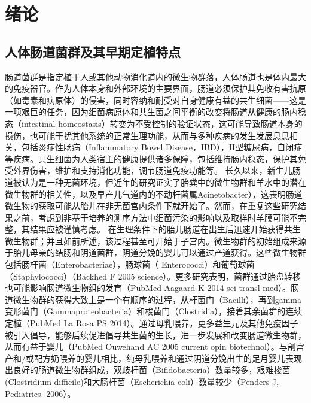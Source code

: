 
\chapter{绪论}
\label{chap:introduction}
\section{人体肠道菌群及其早期定植特点}
肠道菌群是指定植于人或其他动物消化道内的微生物群落，人体肠道也是体内最大的免疫器官。作为人体本身和外部环境的主要界面，肠道必须保护其免收有害抗原（如毒素和病原体）的侵害，同时容纳和耐受对自身健康有益的共生细菌——这是一项艰巨的任务，因为细菌病原体和共生菌之间平衡的改变将肠道从健康的肠内稳态（intestinal homeostasis）\cite{collier2005innate}转变为不受控制的验证状态，这可能导致肠道本身的损伤，也可能干扰其他系统的正常生理功能，从而与多种疾病的发生发展息息相关，包括炎症性肠病（Inflammatory Bowel Disease，IBD）\cite{ni2017gut}，II型糖尿病\cite{harsch2018role}，自闭症\cite{de2014altered, de2013fecal}等疾病。共生细菌为人类宿主的健康提供诸多保障，包括维持肠内稳态\cite{hooper2001commensal}，保护其免受外界伤害\cite{rakoff2004recognition}，维护和支持消化功能\cite{guarner2006mechanisms}，调节肠道免疫功能\cite{round2009gut,abreu2010toll}等。
长久以来，新生儿肠道被认为是一种无菌环境，但近年的研究证实了胎粪中的微生物群和羊水中的潜在微生物群的相关性\cite{ardissone2014meconium}，以及早产儿气道内的不动杆菌属Acinetobacter）\cite{lohmann2014airway}，这表明肠道微生物的获取可能从胎儿在非无菌宫内条件下就开始了。然而，在重复这些研究结果之前，考虑到非基于培养的测序方法\cite{pennisi2014our}中细菌污染的影响以及取样时羊膜可能不完整，其结果应被谨慎考虑。
在生理条件下的胎儿肠道在出生后迅速开始获得共生微生物群；并且如前所述，该过程甚至可开始于子宫内。微生物群的初始组成来源于胎儿母亲的结肠和阴道菌群，阴道分娩的婴儿可以通过产道获得。这些微生物群包括肠杆菌（Enterobacteriae），肠球菌（ Enterococci）和葡萄球菌（Staphylococci）\cite{}（Backhed F 2005 science）。更多研究表明，菌群通过胎盘转移也可能影响肠道微生物组的发育\cite{}（PubMed Aagaard K 2014 sci transl med）。肠道微生物群的获得大致上是一个有顺序的过程，从杆菌门（Bacilli），再到gamma变形菌门（Gammaproteobacteria）和梭菌门（Clostridia），接着其余菌群的连续定植\cite{}（PubMed La Rosa PS 2014）。通过母乳喂养，更多益生元及其他免疫因子被引入倡导，能够后续促进倡导共生菌的生长，进一步发展和改变肠道微生物群，从而有益于婴儿​​\cite{}（PubMed Ouwehand AC 2005 current opin biotechnol）。与剖宫产和/或配方奶喂养的婴儿相比，纯母乳喂养和通过阴道分娩出生的足月婴儿表现出良好的肠道微生物群组成，双歧杆菌（Bifidobacteria）数量较多，艰难梭菌(Clostridium difficile)和大肠杆菌（Escherichia coli）数量较少\cite{}（Penders J, Pediatrics. 2006）。

